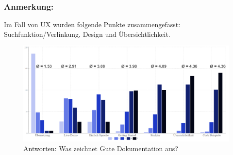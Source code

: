 \subsubsection*{Anmerkung:}
Im Fall von UX wurden folgende Punkte zusammengefasst: Suchfunktion/Verlinkung, Design und
Übersichtlichkeit.


\newpage




\begin{figure}[h]
    \centering
    \includegraphics[scale=0.05]{figures/05/GuteDoku_BarChart.png}
    \caption{Antworten: Was zeichnet Gute Dokumentation aus?}
    \label{abb:GuteDoku_BarChart}
\end{figure}

